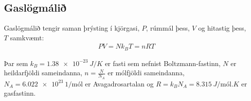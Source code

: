 \newpage

\subsection*{Gaslögmálið}

\begin{tcolorbox}
Gaslögmálið tengir saman þrýsting í kjörgasi, $P$, rúmmál þess, $V$ og hitastig þess, $T$ samkvæmt:
\begin{align*}
    PV = Nk_B T = nR T
\end{align*}

\vspace{-0.25cm}

Þar sem $k_B = \SI{1.38e-23}{J/K}$ er fasti sem nefnist Boltzmann-fastinn,
$N$ er heildarfjöldi sameindanna,
$n = \frac{N}{N_A}$ er mólfjöldi sameindanna, $N_A = \SI{6.022e23}{1/\text{mól}}$
er Avagadrosartalan og $R = k_B N_A = \SI{8.315}{J/\text{mól}.K}$ er gasfastinn.
\end{tcolorbox}

